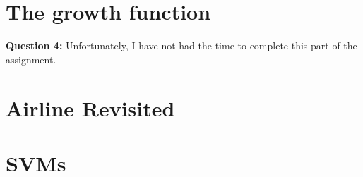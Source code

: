 \documentclass[12pt]{article}
\begin{document}
\section{The growth function}

\textbf{Question 4:} Unfortunately, I have not had the time to complete this part of the assignment.

\section{Airline Revisited}



\section{SVMs}


\end{document}
